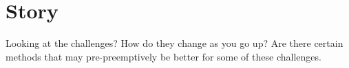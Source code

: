 \section{Story}

Looking at the challenges?
How do they change as you go up?
Are there certain methods that may pre-preemptively be better for some of these challenges.